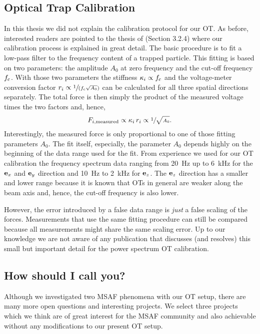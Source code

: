 \subsection{Optical Trap Calibration}

In this thesis we did not explain the calibration protocol for our OT. As 
before, interested readers are pointed to the thesis of  
(Section 3.2.4) where our calibration process is explained in great detail. The 
basic procedure is to fit a low-pass filter to the frequency content of a 
trapped particle. This fitting is based on two parameters: the amplitude 
$A_{0}$ at zero frequency and the cut-off frequency $f_{\mathrm{c}}$. With those 
two parameters the stiffness $\kappa_{i}\propto f_{\mathrm{c}}$ and the 
voltage-meter conversion factor $r_{i}\propto \sfrac{1}{(f_{\mathrm{c}}\sqrt{A_{0}} 
)}$ can be calculated for all three spatial directions separately. The total 
force is then simply the product of the measured voltage times the two factors 
and, hence, \begin{equation}
  F_{i,\mathrm{measured}}\propto \kappa_{i}\,r_{i}\propto 
  \sfrac{1}{\sqrt{A_{0}}}.
\end{equation}
Interestingly, the measured force is only proportional to one of those fitting 
parameters $A_{0}$. The fit itself, especially, the parameter $A_{0}$ depends 
highly on the beginning of the data range used for the fit. From experience we 
used for our OT calibration the frequency spectrum data ranging from 
\SI{20}{\hertz} up to \SI{6}{\kilo\hertz} for the $\vb{e}_{x}$ and $\vb{e}_{y}$ direction and 
\SI{10}{\hertz} to \SI{2}{\kilo\hertz} for $\vb{e}_{z}$. The $\vb{e}_{z}$ direction has a 
smaller and lower range because it is known that OTs in general are weaker 
along the beam axis and, hence, the cut-off frequency is also lower.

However, the error introduced by a false data range is \emph{just} a false 
scaling of the forces. Measurements that use the same fitting procedure can 
still be compared because all measurements might share the same scaling error. 
Up to our knowledge we are not aware of any publication that discusses (and 
resolves) this small but important detail for the power spectrum OT 
calibration.

\subsection{How should I call you?}

Although we investigated two MSAF phenomena with our OT setup, there are many 
more open questions and interesting projects. We select three projects which we 
think are of great interest for the MSAF community and also achievable without 
any modifications to our present OT setup.

